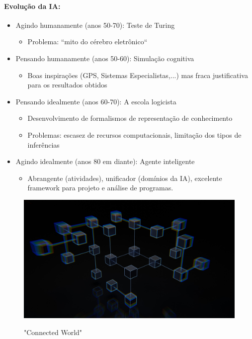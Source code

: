 \documentclass{article}
\begin{document}
\paragraph{Evolução da IA:}
\begin{itemize}
    \item Agindo humanamente (anos 50-70): Teste de Turing \begin{itemize}
        \item Problema: “mito do cérebro eletrônico“
    \end{itemize}
    \item Pensando humanamente (anos 50-60): Simulação cognitiva
    \begin{itemize}
        \item Boas inspirações (GPS, Sistemas Especialistas,...) mas fraca justificativa para os resultados obtidos
    \end{itemize}
    \item Pensando idealmente (anos 60-70): A escola logicista
    \begin{itemize}
        \item Desenvolvimento de formalismos de representação de conhecimento
        \item Problemas: escasez de recursos computacionais, limitação dos tipos de inferências
    \end{itemize}
    \item Agindo idealmente (anos 80 em diante): Agente inteligente
    \begin{itemize}
        \item Abrangente (atividades), unificador (domínios da IA), excelente framework para projeto e análise de programas.
    \end{itemize}
\end{itemize}

\begin{figure}[h!]
    \centering
    \includegraphics[width=\textwidth]{connected-world.jpg}
    \caption{"Connected World"}\cite{IMAGE2}
    \label{fig:my_label}
\end{figure}
\end{document}
